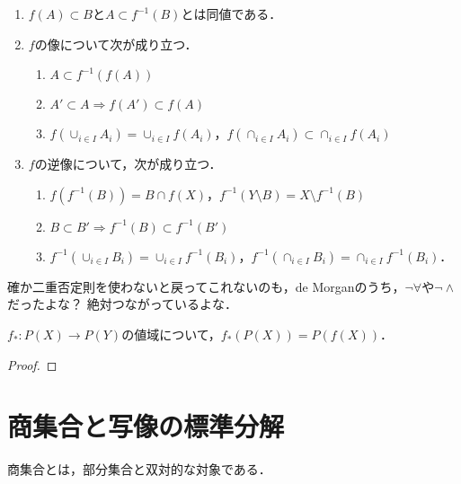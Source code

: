 \documentclass[uplatex, 12pt, dvipdfmx]{jsreport}
\begin{document}
\begin{proposition}[像と逆像と集合演算の絡み合い]\mbox{}
    \begin{enumerate}
        \item $f(A)\subset B$と$A\subset f^{-1}(B)$とは同値である．
        \item $f$の像について次が成り立つ．
        \begin{enumerate}[(1)]
            \item $A\subset f^{-1}(f(A))$
            \item $A'\subset A\Rightarrow f(A')\subset f(A)$
            \item $f(\cup_{i\in I}A_i)=\cup_{i\in I}f(A_i)$，$f(\cap_{i\in I}A_i)\subset \cap_{i\in I}f(A_i)$
        \end{enumerate}
        \item $f$の逆像について，次が成り立つ．
        \begin{enumerate}[(1)]
            \item $f(f^{-1}(B))=B\cap f(X)$，$f^{-1}(Y\setminus B)=X\setminus f^{-1}(B)$
            \item $B\subset B'\Rightarrow f^{-1}(B)\subset f^{-1}(B')$
            \item $f^{-1}(\cup_{i\in I}B_i)=\cup_{i\in I}f^{-1}(B_i)$，$f^{-1}(\cap_{i\in I}B_i)=\cap_{i\in I}f^{-1}(B_i)$．
        \end{enumerate}
    \end{enumerate}
\end{proposition}
\begin{remark}
    確か二重否定則を使わないと戻ってこれないのも，de Morganのうち，$\lnot\forall$や$\lnot\land$だったよな？
    絶対つながっているよな．
\end{remark}

\begin{problem}[A2.5.3]
    $f_*:P(X)\to P(Y)$の値域について，$f_*(P(X))=P(f(X))$．
\end{problem}
\begin{proof}
    
\end{proof}

\section{商集合と写像の標準分解}

\begin{screen}
    商集合とは，部分集合と双対的な対象である．
\end{screen}
\end{document}
